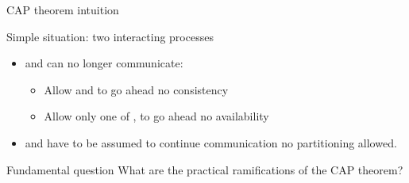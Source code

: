 \begin{slide}{CAP theorem intuition}
  \begin{block}{Simple situation: two interacting processes}
    \begin{itemize}
    \item {} and  can no longer communicate:
      \begin{itemize}
      \item Allow  and  to go ahead \mathexpr{\Rightarrow} no consistency
      \item Allow only one of ,  to go ahead \mathexpr{\Rightarrow} no availability
      \end{itemize}
    \item {} and  have to be assumed to continue communication \mathexpr{\Rightarrow} no
      partitioning allowed.
    \end{itemize}
  \end{block}

  \onslide
  \begin{alertblock}{Fundamental question}
    What are the practical ramifications of the CAP theorem?
  \end{alertblock}
\end{slide}

